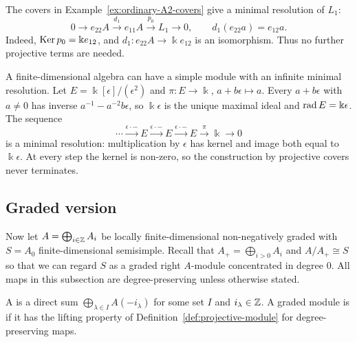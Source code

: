 \begin{example}\label{ex:ordinary-A2-resolution}
The covers in Example~\ref{ex:ordinary-A2-covers} give a minimal resolution of $L_1$:
\[
0\longrightarrow e_{22}A\xrightarrow{d_1}e_{11}A
\xrightarrow{p_0}L_1\longrightarrow0,\qquad
d_1(e_{22}a)=e_{12}a.
\]
Indeed, $\operatorname{Ker}\nolimits p_0=\Bbbk e_{12}$, and $d_1:e_{22}A\to\Bbbk e_{12}$ is an isomorphism.
Thus no further projective terms are needed.
\end{example}

\begin{example}\label{ex:ordinary-exterior-resolution}
A finite-dimensional algebra can have a simple module with an infinite minimal resolution.
Let $E=\Bbbk[\epsilon]/(\epsilon^2)$ and $\pi:E\to\Bbbk$, $a+b\epsilon\mapsto a$.
Every $a+b\epsilon$ with $a\neq0$ has inverse $a^{-1}-a^{-2}b\epsilon$, so $\Bbbk\epsilon$ is the unique maximal ideal and $\operatorname{rad}\nolimits E=\Bbbk\epsilon$.
The sequence
\[
\cdots\xrightarrow{\epsilon\cdot-}E\xrightarrow{\epsilon\cdot-}E
\xrightarrow{\epsilon\cdot-}E\xrightarrow{\pi}\Bbbk\longrightarrow0
\]
is a minimal resolution: multiplication by $\epsilon$ has kernel and image both equal to $\Bbbk\epsilon$.
At every step the kernel is non-zero, so the construction by projective covers never terminates.
\end{example}

\subsection{Graded version}\label{subsec:graded-resolutions}

Now let $A=\bigoplus_{i\in\mathbb{Z}}A_i$ be locally finite-dimensional non-negatively graded with $S=A_0$ finite-dimensional semisimple.
Recall that $A_+=\bigoplus_{i>0}A_i$ and $A/A_+\cong S$ so that we can regard $S$ as a graded right $A$-module concentrated in degree $0$.
All maps in this subsection are degree-preserving unless otherwise stated.

\begin{definition}\label{def:graded-projective}
A  is a direct sum $\bigoplus_{\lambda\in I}A(-i_\lambda)$ for some set $I$ and $i_\lambda\in\mathbb{Z}$.
A graded module is  if it has the lifting property of Definition~\ref{def:projective-module} for degree-preserving maps.
\end{definition}


